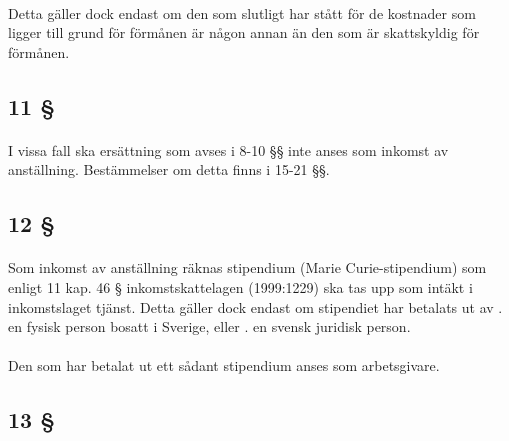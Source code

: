 \documentclass[a4paper,notitlepage,openany,10pt]{book}
\begin{document}
\paragraph*{}
Detta gäller dock endast om den som slutligt har stått för de kostnader som ligger till grund för förmånen är någon annan än den som är skattskyldig för förmånen.
\subsection*{11 §}
\paragraph*{}
I vissa fall ska ersättning som avses i 8-10 §§ inte anses som inkomst av anställning. Bestämmelser om detta finns i 15-21 §§.
\subsection*{12 §}
\paragraph*{}
Som inkomst av anställning räknas stipendium (Marie Curie-stipendium) som enligt 11 kap. 46 § inkomstskattelagen (1999:1229) ska tas upp som intäkt i inkomstslaget tjänst.
Detta gäller dock endast om stipendiet har betalats ut av
. en fysisk person bosatt i Sverige, eller
. en svensk juridisk person.
\paragraph*{}
Den som har betalat ut ett sådant stipendium anses som arbetsgivare.
\subsection*{13 §}
\end{document}
